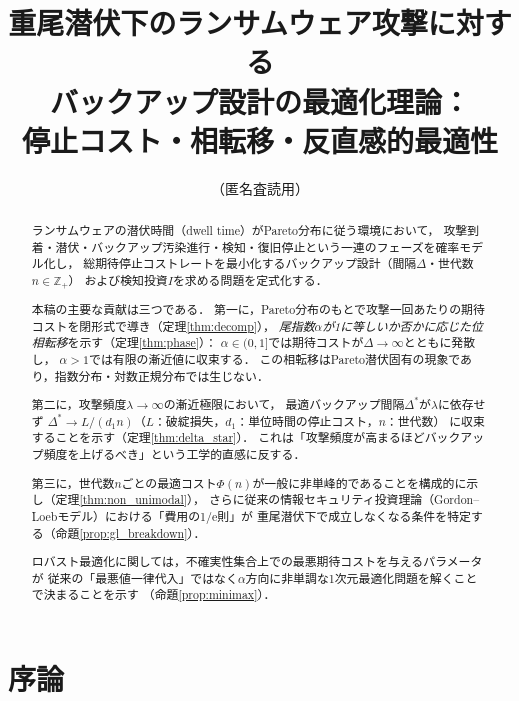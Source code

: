 \documentclass[12pt,a4paper]{article}
\theoremstyle{plain}
\theoremstyle{definition}
\theoremstyle{remark}
\newcommand{\Dopt}{\Delta^*}
\begin{document}
\title{%
重尾潜伏下のランサムウェア攻撃に対する\\
バックアップ設計の最適化理論：\\
停止コスト・相転移・反直感的最適性}
\author{（匿名査読用）}
\date{}
\maketitle

\begin{abstract}
ランサムウェアの潜伏時間（dwell time）がPareto分布に従う環境において，
攻撃到着・潜伏・バックアップ汚染進行・検知・復旧停止という一連のフェーズを確率モデル化し，
総期待停止コストレートを最小化するバックアップ設計（間隔$\Delta$・世代数$n\in\mathbb Z_+$）
および検知投資$I$を求める問題を定式化する．

本稿の主要な貢献は三つである．
第一に，Pareto分布のもとで攻撃一回あたりの期待コストを閉形式で導き（定理\ref{thm:decomp}），
\emph{尾指数$\alpha$が1に等しいか否かに応じた位相転移}を示す（定理\ref{thm:phase}）：
$\alpha\in(0,1]$では期待コストが$\Delta\to\infty$とともに発散し，
$\alpha>1$では有限の漸近値に収束する．
この相転移はPareto潜伏固有の現象であり，指数分布・対数正規分布では生じない．

第二に，攻撃頻度$\lambda\to\infty$の漸近極限において，
最適バックアップ間隔$\Dopt$が$\lambda$に依存せず
$\Dopt\to L/(d_1 n)$（$L$：破綻損失，$d_1$：単位時間の停止コスト，$n$：世代数）
に収束することを示す（定理\ref{thm:delta_star}）．
これは「攻撃頻度が高まるほどバックアップ頻度を上げるべき」という工学的直感に反する．

第三に，世代数$n$ごとの最適コスト$\Phi(n)$が一般に非単峰的であることを構成的に示し（定理\ref{thm:non_unimodal}），
さらに従来の情報セキュリティ投資理論（Gordon--Loebモデル）における「費用の1/e則」が
重尾潜伏下で成立しなくなる条件を特定する（命題\ref{prop:gl_breakdown}）．

ロバスト最適化に関しては，不確実性集合上での最悪期待コストを与えるパラメータが
従来の「最悪値一律代入」ではなく$\alpha$方向に非単調な1次元最適化問題を解くことで決まることを示す
（命題\ref{prop:minimax}）．
\end{abstract}

\section{序論}
\label{sec:intro}
\end{document}
